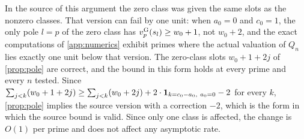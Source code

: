 \begin{remark}\label{rem:zero-class}
In the source of this argument the zero class was given the same slots as the nonzero classes. That version can fail by one unit: when $a_0=0$ and $c_0=1$, the only pole $l=p$ of the zero class has $v^{\mathrm{G}}_{p}(s_l)\ge w_0+1$, not $w_0+2$, and the exact computations of \cref{app:numerics} exhibit primes where the actual valuation of $Q_n$ lies exactly one unit below that version. The zero-class slots $w_0+1+2j$ of \cref{prop:pole} are correct, and the bound in this form holds at every prime and every $n$ tested. Since $\sum_{j<k}(w_0+1+2j)\ge\sum_{j<k}(w_0+2j)+2\cdot\ind_{k=c_0-a_0,\ a_0=0}-2$ for every $k$, \cref{prop:pole} implies the source version with a correction $-2$, which is the form in which the source bound is valid. Since only one class is affected, the change is $O(1)$ per prime and does not affect any asymptotic rate.
\end{remark}

